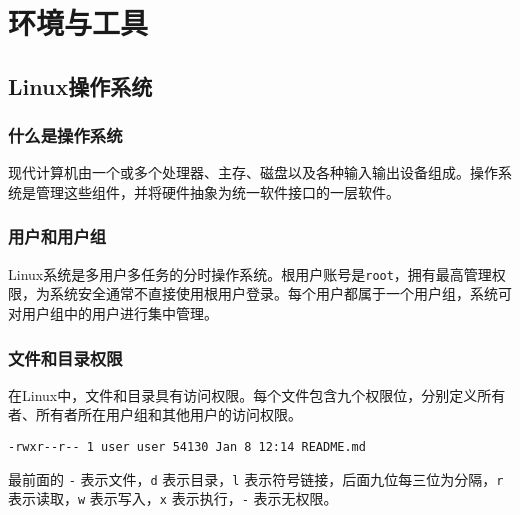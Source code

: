 \section{环境与工具}
\subsection{Linux操作系统}
\subsubsection{什么是操作系统}
现代计算机由一个或多个处理器、主存、磁盘以及各种输入输出设备组成。操作系统是管理这些组件，并将硬件抽象为统一软件接口的一层软件。
\subsubsection{用户和用户组}
Linux系统是多用户多任务的分时操作系统。根用户账号是\texttt{root}，拥有最高管理权限，为系统安全通常不直接使用根用户登录。每个用户都属于一个用户组，系统可对用户组中的用户进行集中管理。

\subsubsection{文件和目录权限}
在Linux中，文件和目录具有访问权限。每个文件包含九个权限位，分别定义所有者、所有者所在用户组和其他用户的访问权限。
\begin{verbatim}
-rwxr--r-- 1 user user 54130 Jan 8 12:14 README.md
\end{verbatim}
最前面的 \texttt{-} 表示文件，\texttt{d} 表示目录，\texttt{l} 表示符号链接，后面九位每三位为分隔，\texttt{r} 表示读取，\texttt{w} 表示写入，\texttt{x} 表示执行，\texttt{-} 表示无权限。



